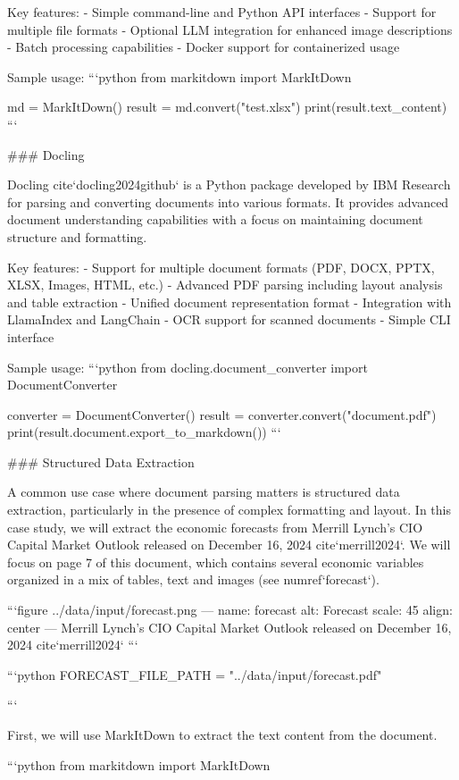 Key features:
- Simple command-line and Python API interfaces
- Support for multiple file formats
- Optional LLM integration for enhanced image descriptions
- Batch processing capabilities
- Docker support for containerized usage

Sample usage:
```python
from markitdown import MarkItDown

md = MarkItDown()
result = md.convert("test.xlsx")
print(result.text_content)
```

### Docling

Docling {cite}`docling2024github` is a Python package developed by IBM Research for parsing and converting documents into various formats. It provides advanced document understanding capabilities with a focus on maintaining document structure and formatting.

Key features:
- Support for multiple document formats (PDF, DOCX, PPTX, XLSX, Images, HTML, etc.)
- Advanced PDF parsing including layout analysis and table extraction
- Unified document representation format
- Integration with LlamaIndex and LangChain
- OCR support for scanned documents
- Simple CLI interface

Sample usage:
```python
from docling.document_converter import DocumentConverter

converter = DocumentConverter()
result = converter.convert("document.pdf")
print(result.document.export_to_markdown())
```

### Structured Data Extraction

A common use case where document parsing matters is structured data extraction, particularly in the presence of complex formatting and layout. In this case study, we will extract the economic forecasts from Merrill Lynch's CIO Capital Market Outlook released on December 16, 2024 {cite}`merrill2024`. We will focus on page 7 of this document, which contains several economic variables organized in a mix of tables, text and images (see {numref}`forecast`).


```{figure} ../data/input/forecast.png
---
name: forecast
alt: Forecast
scale: 45%
align: center
---
Merrill Lynch's CIO Capital Market Outlook released on December 16, 2024 {cite}`merrill2024`
```


```python
FORECAST_FILE_PATH = "../data/input/forecast.pdf"

```

First, we will use MarkItDown to extract the text content from the document.


```python
from markitdown import MarkItDown

